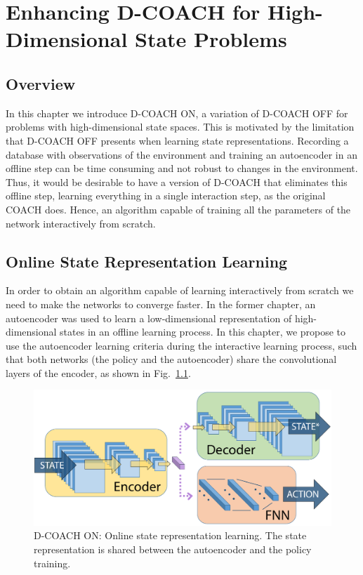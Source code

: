 \chapter{Enhancing D-COACH for High-Dimensional State Problems}
\section{Overview}

In this chapter we introduce  D-COACH ON, a variation of D-COACH OFF for problems with high-dimensional state spaces. This is motivated by the limitation that D-COACH OFF presents when learning state representations. Recording a database with observations of the environment and training an autoencoder in an offline step can be time consuming and not robust to changes in the environment. Thus, it would be desirable to have a version of D-COACH that eliminates this offline step, learning everything in a single interaction step, as the original COACH does. Hence, an algorithm capable of training all the parameters of the network interactively from scratch. 

\section{Online State Representation Learning}
In order to obtain an algorithm capable of learning interactively from scratch we need to make the networks to converge faster. In the former chapter, an autoencoder was used to learn a low-dimensional representation of high-dimensional states in an offline learning process. In this chapter, we propose to use the autoencoder learning criteria during the interactive learning process, such that both networks (the policy and the autoencoder) share the convolutional layers of the encoder, as shown in Fig.~\ref{fig:msim}.

\begin{figure}[H]
    \centering
    \includegraphics[width=0.6\linewidth]{imagenes/cap2/m2.pdf}
    \caption{D-COACH ON: Online state representation learning. The state representation is shared between the autoencoder and the policy training.}
    \label{fig:msim}
\end{figure}

